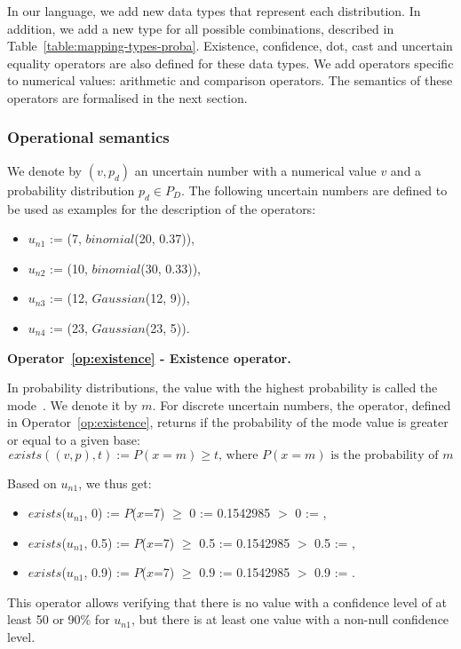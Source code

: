 In our language, we add new data types that represent each distribution.
In addition, we add a new type for all possible combinations, described in Table~\ref{table:mapping-types-proba}.
Existence, confidence, dot, cast and uncertain equality operators are also defined for these data types.
We add operators specific to numerical values: arithmetic and comparison operators.
The semantics of these operators are formalised in the next section.	

\subsubsection{Operational semantics}
We denote by $(v, p_d)$ an uncertain number with a numerical value $v$ and a probability distribution $p_d \in P_D$.
The following uncertain numbers are defined to be used as examples for the description of the operators:
\begin{itemize}
    \item $u_{n1}$ := (7, $binomial$(20, 0.37)),
    \item $u_{n2}$ := (10, $binomial$(30, 0.33)),
    \item $u_{n3}$ := (12, $Gaussian$(12, 9)),
    \item $u_{n4}$ := (23, $Gaussian$(23, 5)).
\end{itemize}

\bigskip

\noindent\textbf{Operator~\ref{op:existence} - Existence operator.~}

In probability distributions, the value with the highest probability is called the mode~\cite{mood1963introduction}.
We denote it by $m$.
For discrete uncertain numbers, the operator, defined in Operator~\ref{op:existence}, returns \true{} if the probability of the mode value is greater or equal to a given base:
\[exists((v, p), t) := P(x=m)\geqslant t \text{, where $P(x=m)$ is the probability of $m$}\]

Based on $u_{n1}$, we thus get:
\begin{itemize}
    \item $exists$($u_{n1}$, 0) := $P$($x$=7) $\geqslant$ 0 := 0.1542985 $>$ 0 := \true{},
    \item $exists$($u_{n1}$, 0.5) := $P$($x$=7) $\geqslant$ 0.5 := 0.1542985 $>$ 0.5 := \false{},
    \item $exists$($u_{n1}$, 0.9) := $P$($x$=7) $\geqslant$ 0.9 := 0.1542985 $>$ 0.9 := \false{}.
\end{itemize}
This operator allows verifying that there is no value with a confidence level of at least 50 or 90\% for $u_{n1}$, but there is at least one value with a non-null confidence level.

